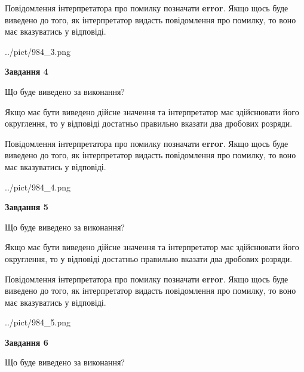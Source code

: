 \documentclass[12pt, ukrainian]{article}
\begin{document}
{\begin {Large}
Повідомлення інтерпретатора про помилку позначати \textbf{error}.
Якщо щось буде виведено до того, як інтерпретатор видасть повідомлення про помилку, 
то воно має вказуватись у відповіді. \par

\begin{center}
	{../pict/984_3.png}
\end{center}
\newpage

{\begin {center}\textbf{Завдання 4}\end {center}}\par
Що буде виведено за виконання? \par

Якщо має бути виведено дійсне значення та інтерпретатор має здійснювати його округлення, 
то у відповіді достатньо правильно вказати два дробових розряди.

Повідомлення інтерпретатора про помилку позначати \textbf{error}.
Якщо щось буде виведено до того, як інтерпретатор видасть повідомлення про помилку, 
то воно має вказуватись у відповіді. \par

\begin{center}
	{../pict/984_4.png}
\end{center}
\newpage

{\begin {center}\textbf{Завдання 5}\end {center}}\par
Що буде виведено за виконання? \par

Якщо має бути виведено дійсне значення та інтерпретатор має здійснювати його округлення, 
то у відповіді достатньо правильно вказати два дробових розряди.

Повідомлення інтерпретатора про помилку позначати \textbf{error}.
Якщо щось буде виведено до того, як інтерпретатор видасть повідомлення про помилку, 
то воно має вказуватись у відповіді. \par

\begin{center}
	{../pict/984_5.png}
\end{center}
\newpage

{\begin {center}\textbf{Завдання 6}\end {center}}\par
Що буде виведено за виконання? \par


\end{Large}}
\end{document}
